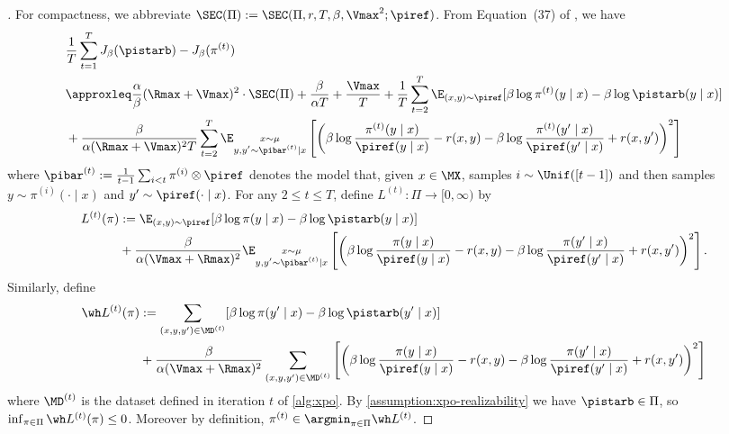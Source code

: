 \begin{proof}[]
For compactness, we abbreviate $\SEC(\Pi) := \SEC(\Pi,r,T,\beta,\Vmax^2;\piref)$. From Equation~(37) of \cite{xie2024exploratory}, we have
\begin{align}
&\frac{1}{T}\sum_{t=1}^T J_\beta(\pistarb) - J_\beta(\pi^{(t)}) \\ 
&\approxleq \frac{\alpha}{\beta} (\Rmax+\Vmax)^2 \cdot \SEC(\Pi) + \frac{\beta}{\alpha T} + \frac{\Vmax}{T} + \frac{1}{T}\sum_{t=2}^T \E_{(x,y) \sim \piref}[\beta\log \pi^{(t)}(y\mid x) - \beta\log\pistarb(y\mid x)] \\ 
&+ \frac{\beta}{\alpha (\Rmax+\Vmax)^2 T} \sum_{t=2}^T \E_{\substack{x \sim \mu \\ y,y' \sim \pibar^{(t)}\mid x}}\left[\left(\beta\log\frac{\pi^{(t)}(y\mid x)}{\piref(y\mid x)} - r(x,y) - \beta \log \frac{\pi^{(t)}(y'\mid x)}{\piref(y'\mid x)} + r(x,y')\right)^2\right]
\end{align} 
where $\pibar^{(t)} := \frac{1}{t-1} \sum_{i < t} \pi^{(i)} \otimes \piref$ denotes the model that, given $x \in \MX$, samples $i \sim \Unif([t-1])$ and then samples $y \sim \pi^{(i)}(\cdot\mid x)$ and $y' \sim \piref(\cdot\mid x)$. For any $2 \leq t \leq T$, define $L^{(t)}:\Pi \to [0,\infty)$ by
\begin{align}
L^{(t)}(\pi) 
&:= \E_{(x,y) \sim \piref}[\beta\log \pi(y\mid x) - \beta\log\pistarb(y\mid x)] \\ 
&+ \frac{\beta}{\alpha (\Vmax+\Rmax)^2} \E_{\substack{x \sim \mu \\ y,y' \sim \pibar^{(t)}\mid x}}\left[\left(\beta\log\frac{\pi(y\mid x)}{\piref(y\mid x)} - r(x,y) - \beta \log \frac{\pi(y'\mid x)}{\piref(y'\mid x)} + r(x,y')\right)^2\right].
\end{align}
Similarly, define
\begin{align}
\wh L^{(t)}(\pi) 
&:= \sum_{(x,y,y') \in \MD^{(t)}}[\beta\log \pi(y'\mid x) - \beta\log\pistarb(y'\mid x)] \\ 
&+ \frac{\beta}{\alpha (\Vmax+\Rmax)^2} \sum_{(x,y,y') \in \MD^{(t)}}\left[\left(\beta\log\frac{\pi(y\mid x)}{\piref(y\mid x)} - r(x,y) - \beta \log \frac{\pi(y'\mid x)}{\piref(y'\mid x)} + r(x,y')\right)^2\right]
\end{align}
where $\MD^{(t)}$ is the dataset defined in iteration $t$ of \cref{alg:xpo}. By \cref{assumption:xpo-realizability} we have $\pistarb \in \Pi$, so $\inf_{\pi\in\Pi} \wh L^{(t)}(\pi) \leq 0$. Moreover by definition, $\pi^{(t)} \in \argmin_{\pi\in\Pi} \wh L^{(t)}$. 


\end{proof}

